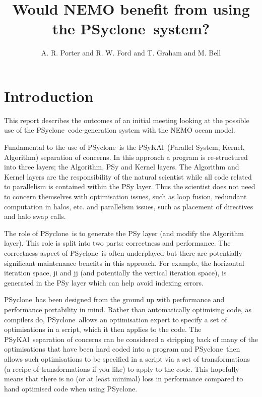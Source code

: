 \documentclass{article}
\newcommand{\psykal}{{PS}y{KA}l}
\newcommand{\psyclone}{{PS}yclone}
\begin{document}
\title{Would NEMO benefit from using the \psyclone\ system?}

\author{A. R. Porter and R. W. Ford and T. Graham and M. Bell}

\maketitle

\section{Introduction}

This report describes the outcomes of an initial meeting looking at
the possible use of the \psyclone\ code-generation system with the NEMO
ocean model.

Fundamental to the use of \psyclone\ is the \psykal\ (Parallel System,
Kernel, Algorithm) separation of concerns. In this approach a program
is re-structured into three layers; the Algorithm, PSy and Kernel
layers.  The Algorithm and Kernel layers are the responsibility of the
natural scientist while all code related to parallelism is contained
within the PSy layer. Thus the scientist does not need to concern
themselves with optimisation issues, such as loop fusion, redundant
computation in halos, etc. and parallelism issues, such as placement
of directives and halo swap calls.


The role of \psyclone\ is to generate the PSy layer (and modify the
Algorithm layer). This role is split into two parts: correctness and
performance. The correctness aspect of \psyclone\ is often underplayed
but there are potentially significant maintenance benefits in this
approach. For example, the horizontal iteration space, ji and jj (and
potentially the vertical iteration space), is generated in the PSy
layer which can help avoid indexing errors.

\psyclone\ has been designed from the ground up with performance and
performance portability in mind. Rather than automatically optimising
code, as compilers do, \psyclone\ allows an optimisation expert to
specify a set of optimisations in a script, which it then applies to
the code. The \psykal\ separation of concerns can be considered a
stripping back of many of the optimisations that have been hard coded
into a program and \psyclone\ then allows such optimisations to be
specified in a script via a set of transformations (a recipe of
transformations if you like) to apply to the code. This hopefully
means that there is no (or at least minimal) loss in performance
compared to hand optimised code when using \psyclone.
\end{document}
